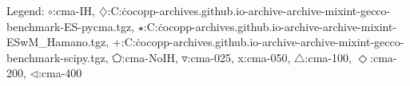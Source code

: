 Legend: {\color{CornflowerBlue}$\circ$}:cma-IH, {\color{Orange}$\diamondsuit$}:C:\Users\tristan\.cocopp\data-archives\numbbo.github.io\data-archive\data-archive\bbob-mixint-gecco-benchmark\CMA-ES-pycma.tgz, {\color{Green}$\star$}:C:\Users\tristan\.cocopp\data-archives\numbbo.github.io\data-archive\data-archive\bbob-mixint\CMA-ESwM\_Hamano.tgz, {\color{red}+}:C:\Users\tristan\.cocopp\data-archives\numbbo.github.io\data-archive\data-archive\bbob-mixint-gecco-benchmark\DE-scipy.tgz, {\color{magenta}$\pentagon$}:cma-NoIH, {\color{brown}$\triangledown$}:cma-025, {{}x}:cma-050, {{}$\triangle$}:cma-100, {{}$\Diamond$}:cma-200, {{}$\triangleleft$}:cma-400